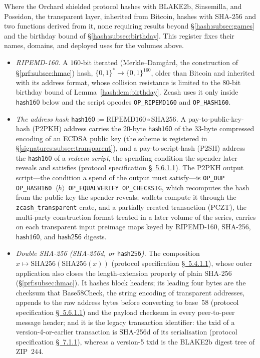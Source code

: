 \documentclass[11pt,a4paper]{article}
\theoremstyle{definition}
\theoremstyle{remark}
\begin{document}
Where the Orchard shielded protocol hashes with BLAKE2b, Sinsemilla,
and Poseidon, the transparent layer, inherited from Bitcoin, hashes
with SHA-256 and two functions derived from it, none requiring results
beyond \S\ref{hash:subsec:games} and the birthday bound of
\S\ref{hash:subsec:birthday}. This register fixes their names,
domains, and deployed uses for the volumes above.
\begin{itemize}
\item \emph{RIPEMD-160.} A \(160\)-bit iterated (Merkle--Damg\aa rd,
  the construction of \S\ref{prf:subsec:hmac}) hash,
  \(\{0,1\}^{*} \to \{0,1\}^{160}\), older than Bitcoin and
  inherited with its address format, whose collision resistance is
  limited to the \(80\)-bit birthday bound of
  Lemma~\ref{hash:lem:birthday}.
  Zcash uses it only inside \(\mathsf{hash160}\) below and the script
  opcodes \texttt{OP\_RIPEMD160} and \texttt{OP\_HASH160}.
\item \emph{The address hash
  \(\mathsf{hash160} := \mathrm{RIPEMD160} \circ \mathrm{SHA256}\).}
  A pay-to-public-key-hash (P2PKH) address carries the \(20\)-byte
  \(\mathsf{hash160}\) of the \(33\)-byte compressed encoding of an
  ECDSA public key (the scheme is registered in
  \S\ref{signatures:subsec:transparent}), and a pay-to-script-hash
  (P2SH) address the \(\mathsf{hash160}\) of a \emph{redeem script},
  the spending condition the spender later reveals and satisfies
  (protocol specification \href{https://zips.z.cash/protocol/protocol.pdf\#transparentaddrencoding}{\S~5.6.1.1}). The P2PKH output script---the
  condition a spend of the output must satisfy---is
  \texttt{OP\_DUP OP\_HASH160 \(\langle h \rangle\) OP\_EQUALVERIFY
  OP\_CHECKSIG}, which recomputes the hash from the public key the
  spender reveals; wallets compute it through the
  \texttt{zcash\_transparent} crate, and a partially created
  transaction (PCZT), the multi-party construction format treated in a
  later volume of the series, carries on each transparent input
  preimage maps keyed by
  RIPEMD-160, SHA-256, \(\mathsf{hash160}\), and \(\mathsf{hash256}\)
  digests.
\item \emph{Double SHA-256 (SHA-256d, or \(\mathsf{hash256}\)).} The
  composition \(x \mapsto \mathrm{SHA256}(\mathrm{SHA256}(x))\)
  (protocol specification \href{https://zips.z.cash/protocol/protocol.pdf\#concretesha256}{\S~5.4.1.1}), whose outer application also
  closes the length-extension property of plain SHA-256
  (\S\ref{prf:subsec:hmac}). It hashes block headers; its
  leading four bytes are the checksum that Base58Check, the string
  encoding of transparent addresses, appends to the raw address bytes
  before converting to base~58 (protocol specification \href{https://zips.z.cash/protocol/protocol.pdf\#transparentaddrencoding}{\S~5.6.1.1}) and the payload checksum in
  every peer-to-peer message header; and it is the
  legacy transaction identifier: the txid of a version-4-or-earlier
  transaction is SHA-256d of its serialisation (protocol
  specification \href{https://zips.z.cash/protocol/protocol.pdf\#txnidentifiers}{\S~7.1.1}), whereas a version-5
  txid is the BLAKE2b digest tree of ZIP~244.
\end{itemize}
\end{document}
